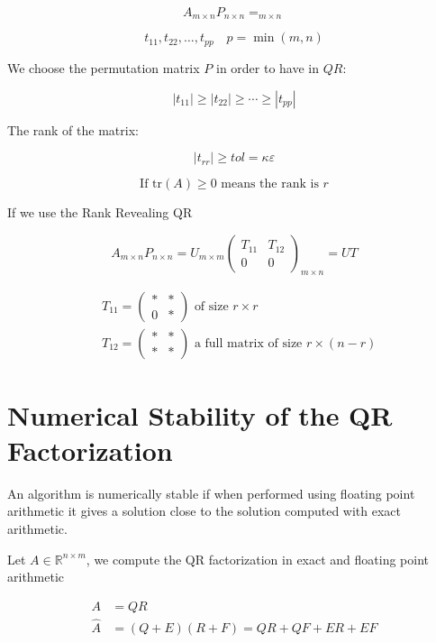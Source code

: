 \[
A_{m \times n} P_{n \times n} = _{m \times n}
\]

\[
t_{11}, t_{22}, \ldots, t_{pp} \quad p = \min(m, n)
\]

We choose the permutation matrix \( P \) in order to have in \( QR \):

\[
|t_{11}| \geq |t_{22}| \geq \cdots \geq |t_{pp}|
\]

The rank of the matrix:

\[
|t_{rr}| \geq tol = \kappa\varepsilon
\]


\[
\text{If } \text{tr}(A) \geq 0 \text{ means the rank is } r
\]

If we use the Rank Revealing QR

\[
A_{m \times n} P_{n \times n} = U_{m \times m} \begin{pmatrix}
T_{11} & T_{12} \\
0 & 0
\end{pmatrix}_{m \times n} = U T
\]

\[
\begin{aligned}
&T_{11} = \begin{pmatrix}
\ast & \ast \\
0 & \ast
\end{pmatrix} \text{ of size } r \times r \\
&T_{12} = \begin{pmatrix}
\ast & \ast \\
\ast & \ast
\end{pmatrix} \text{ a full matrix} \text{ of size } r \times (n-r)
\end{aligned}
\]

\section{Numerical Stability of the QR Factorization}





An algorithm is numerically stable if when performed using floating point arithmetic it gives a solution close to the solution computed with exact arithmetic.

Let $A \in \mathbb{R}^{n \times m}$, we compute the QR factorization in exact and floating point arithmetic

\begin{align*}
A &= QR \quad \\
\hat{A} &= (Q+E)(R+F) = QR + QF + ER + EF
\end{align*}

